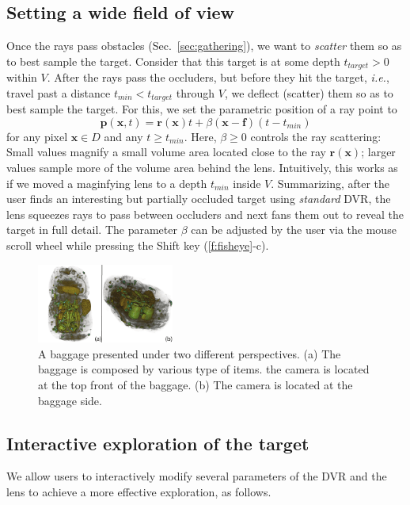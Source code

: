 \subsection{Setting a wide field of view}
\label{sec:scattering}
%
Once the rays pass obstacles (Sec.~\ref{sec:gathering}), we want to \emph{scatter} them so as to best sample the target. Consider that this target is at some depth $t_{target}>0$ within $V$. After the rays pass the occluders, but before they hit the target, \emph{i.e.}, travel past a distance $t_{min} < t_{target}$ through $V$, we deflect (scatter) them so as to best sample the target. For this, we set the parametric position of a ray point to
%
\begin{equation}
\mathbf{p}(\mathbf{x}, t) = \mathbf{r}(\mathbf{x})t + \beta (\mathbf{x}-\mathbf{f})(t-t_{min})
\label{eqn:scattering}
\end{equation}
%
for any pixel $\mathbf{x} \in D$ and any $t \geq t_{min}$. Here, $\beta \geq 0$ controls the ray scattering: Small values magnify a small volume area located close to the ray $\mathbf{r}(\mathbf{x})$; larger values sample more of the volume area behind the lens. Intuitively, this works as if we moved a maginfying lens to a depth $t_{min}$ inside $V$. Summarizing, after the user finds an interesting but partially occluded target using \emph{standard} DVR, the lens squeezes rays to pass between occluders and next fans them out to reveal the target in full detail. The parameter $\beta$ can be adjusted by the user via the mouse scroll wheel while pressing the Shift key (\autoref{f:fisheye}-c).
%
%
\begin{figure}[htbp]
\centering
\includegraphics [width=0.4\textwidth]{images/bagage_orientation_bis.pdf}
\caption{A baggage presented under two different perspectives. (a) The baggage is composed by various type of items. the camera is located at the top front of the baggage. (b) The camera is located at the baggage side.}
\label{f:baggage_orientation}
\end{figure}

\subsection{Interactive exploration of the target}
%
We allow users to interactively modify several parameters of the DVR and the lens to achieve a more effective exploration, as follows.

